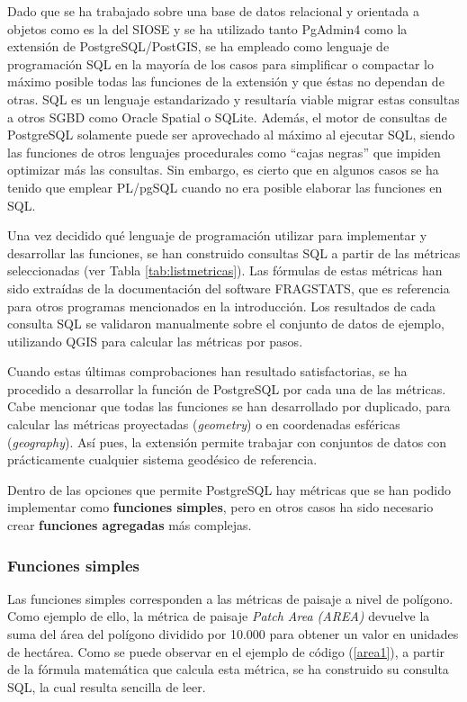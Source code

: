 Dado que se ha trabajado sobre una base de datos relacional y orientada a objetos como es la del SIOSE y se ha utilizado tanto PgAdmin4 como la extensión de PostgreSQL/PostGIS, se ha empleado como lenguaje de programación SQL en la mayoría de los casos para simplificar o compactar lo máximo posible todas las funciones de la extensión y que éstas no dependan de otras. SQL es un lenguaje estandarizado y resultaría viable migrar estas consultas a otros SGBD como Oracle Spatial o SQLite. Además, el motor de consultas de PostgreSQL solamente puede ser aprovechado al máximo al ejecutar SQL, siendo las funciones de otros lenguajes procedurales como ``cajas negras'' que impiden optimizar más las consultas. Sin embargo, es cierto que en algunos casos se ha tenido que emplear PL/pgSQL cuando no era posible elaborar las funciones en SQL.

Una vez decidido qué lenguaje de programación utilizar para implementar y desarrollar las funciones, se han construido consultas SQL a partir de las métricas seleccionadas (ver Tabla \ref{tab:listmetricas}). Las fórmulas de estas métricas han sido extraídas de la documentación del software FRAGSTATS, que es referencia para otros programas mencionados en la introducción. Los resultados de cada consulta SQL se validaron manualmente sobre el conjunto de datos de ejemplo, utilizando QGIS para calcular las métricas por pasos.

Cuando estas últimas comprobaciones han resultado satisfactorias, se ha procedido a desarrollar la función de PostgreSQL por cada una de las métricas. Cabe mencionar que todas las funciones se han desarrollado por duplicado, para calcular las métricas proyectadas (\textit{geometry}) o en coordenadas esféricas (\textit{geography}). Así pues, la extensión permite trabajar con conjuntos de datos con prácticamente cualquier sistema geodésico de referencia.

Dentro de las opciones que permite PostgreSQL hay métricas que se han podido implementar como \textbf{funciones simples}, pero en otros casos ha sido necesario crear \textbf{funciones agregadas} más complejas.

\subsubsection{Funciones simples}

Las funciones simples corresponden a las métricas de paisaje a nivel de polígono. Como ejemplo de ello, la métrica de paisaje \textit{Patch Area (AREA)} devuelve la suma del área del polígono dividido por 10.000 para obtener un valor en unidades de hectárea. Como se puede observar en el ejemplo de código (\ref{area1}), a partir de la fórmula matemática que calcula esta métrica, se ha construido su consulta SQL, la cual resulta sencilla de leer.

